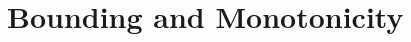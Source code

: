 \documentclass[../../main.tex]{subfiles}
\begin{document}
\section{Bounding and Monotonicity}
\end{document}
